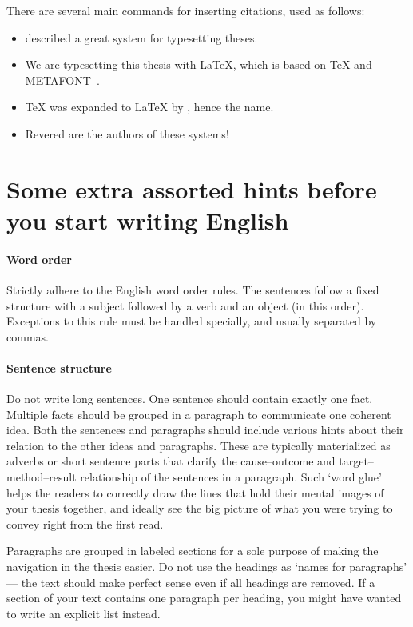 There are several main commands for inserting citations, used as follows:
\begin{itemize}
\item \citet{knuth1979tex} described a great system for typesetting theses.
\item We are typesetting this thesis with \LaTeX, which is based on \TeX{} and METAFONT~\cite{knuth1979tex}.
\item \TeX{} was expanded to \LaTeX{} by \citet{lamport1994latex}, hence the name.
\item Revered are the authors of these systems!~\cite{knuth1979tex,lamport1994latex}
\end{itemize}

\section{Some extra assorted hints before you start writing English}

\paragraph{Word order}
Strictly adhere to the English word order rules. The sentences follow a fixed structure with a subject followed by a verb and an object (in this order). Exceptions to this rule must be handled specially, and usually separated by commas.

\paragraph{Sentence structure}
Do not write long sentences. One sentence should contain exactly one fact. Multiple facts should be grouped in a paragraph to communicate one coherent idea. Both the sentences and paragraphs should include various hints about their relation to the other ideas and paragraphs. These are typically materialized as adverbs or short sentence parts that clarify the cause--outcome and target--method--result relationship of the sentences in a paragraph. Such `word glue' helps the readers to correctly draw the lines that hold their mental images of your thesis together, and ideally see the big picture of what you were trying to convey right from the first read.

Paragraphs are grouped in labeled sections for a sole purpose of making the navigation in the thesis easier. Do not use the headings as `names for paragraphs' --- the text should make perfect sense even if all headings are removed. If a section of your text contains one paragraph per heading, you might have wanted to write an explicit list instead.

